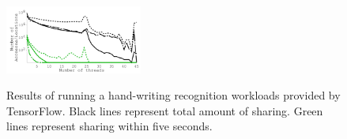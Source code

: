 {
\begin{figure}[th]
\begin{center}
\centerline{\includegraphics[width=0.4\textwidth]{Figures/g_plot_tensorflow_average.pdf}}
\vspace{-0.15in}
{
Results of running a hand-writing recognition workloads provided by TensorFlow.
Black lines represent total amount of sharing.
Green lines represent sharing within five seconds.
}
\end{center}
\vspace{-0.2in}
\end{figure}
}
